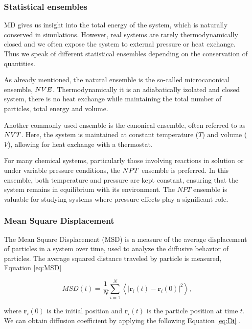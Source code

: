 \subsubsection{Statistical ensembles}
MD gives us insight into the total energy of the system, which is naturally conserved in simulations. However, real systems are rarely thermodynamically closed and we often expose the system to external pressure or heat exchange. Thus we speak of different statistical ensembles depending on the conservation of quantities.

As already mentioned, the natural ensemble is the so-called microcanonical ensemble, $\boldmath{NVE}$. Thermodynamically it is an adiabatically izolated and closed system, there is no heat exchange while maintaining the total number of particles, total energy and volume. 

Another commonly used ensemble is the canonical ensemble, often referred to as $\boldmath{NVT}$. Here, the system is maintained at constant temperature ($T$) and volume ($V$), allowing for heat exchange with a thermostat.

For many chemical systems, particularly those involving reactions in solution or under variable pressure conditions, the $\boldmath{NPT}$ ensemble is preferred. In this ensemble, both temperature and pressure are kept constant, ensuring that the system remains in equilibrium with its environment. The $NPT$ ensemble is valuable for studying systems where pressure effects play a significant role.


\subsubsection{Mean Square Displacement}
The Mean Square Displacement (MSD) is a measure of the average displacement of particles in a system over time, used to analyze the diffusive behavior of particles. The average squared distance traveled by particle is measured, Equation \ref{eq:MSD}

\begin{equation}\label{eq:MSD}
MSD(t) = \frac{1}{N} \sum_{i=1}^{N} \left\langle \left| \mathbf{r}_i(t) - \mathbf{r}_i(0) \right|^2 \right\rangle,
\end{equation}

where $\mathbf{r}_i(0)$ is the initial position and $\mathbf{r}_i(t)$ is the particle position at time $t$. We can obtain diffusion coefficient by applying the following Equation \ref{eq:Di} \cite{braun_best_2019}. 

